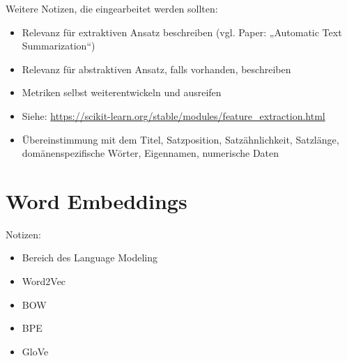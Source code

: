 Weitere Notizen, die eingearbeitet werden sollten:
\begin{itemize}
	\item Relevanz für extraktiven Ansatz beschreiben (vgl. Paper: „Automatic Text Summarization“)
	\item Relevanz für abstraktiven Ansatz, falls vorhanden, beschreiben
	\item Metriken selbst weiterentwickeln und ausreifen
	\item Siehe: \url{https://scikit-learn.org/stable/modules/feature_extraction.html}
	\item Übereinstimmung mit dem Titel, Satzposition, Satzähnlichkeit, Satzlänge, domänenspezifische Wörter, Eigennamen, numerische Daten
\end{itemize}


\section{Word Embeddings}
Notizen:
\begin{itemize}
	\item Bereich des Language Modeling
	\item Word2Vec
	\item BOW
	\item BPE
	\item GloVe
\end{itemize}


